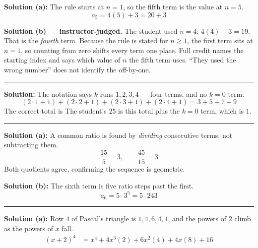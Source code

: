 \documentclass[12pt]{article}
\begin{document}




\textbf{Solution (a):} The rule starts at $n = 1$, so the fifth term is the value at $n = 5$.
\[ a_5 = 4(5) + 3 = 20 + 3 \]

\vspace{0.15cm}
\textbf{Solution (b) --- instructor-judged.} The student used $n = 4$: $4(4) + 3 = 19$. That
is the \emph{fourth} term. Because the rule is stated for $n \ge 1$, the first term sits at
$n = 1$, so counting from zero shifts every term one place. Full credit names the starting
index and says which value of $n$ the fifth term uses. ``They used the wrong number'' does
not identify the off-by-one.

\vspace{0.2cm}\noindent\rule{\linewidth}{0.2pt}


\textbf{Solution:} The notation says $k$ runs $1, 2, 3, 4$ --- four terms, and no $k = 0$
term.
\[ (2 \cdot 1 + 1) + (2 \cdot 2 + 1) + (2 \cdot 3 + 1) + (2 \cdot 4 + 1) = 3 + 5 + 7 + 9 \]
The correct total is 
The student's $25$ is this total plus the $k = 0$ term, which is $1$.

\vspace{0.2cm}\noindent\rule{\linewidth}{0.2pt}


\textbf{Solution (a):} A common ratio is found by \emph{dividing} consecutive terms, not
subtracting them.
\[ \frac{15}{5} = 3, \qquad \frac{45}{15} = 3 \]
Both quotients agree, confirming the sequence is geometric. 

\textbf{Solution (b):} The sixth term is five ratio steps past the first.
\[ a_6 = 5 \cdot 3^5 = 5 \cdot 243 \]

\vspace{0.2cm}\noindent\rule{\linewidth}{0.2pt}


\textbf{Solution (a):} Row $4$ of Pascal's triangle is $1, 4, 6, 4, 1$, and the powers of $2$
climb as the powers of $x$ fall.
\begin{align*}
  (x + 2)^4 &= x^4 + 4x^3(2) + 6x^2(4) + 4x(8) + 16
\end{align*}
\end{document}
